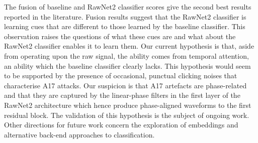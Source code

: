 \documentclass{article}
\begin{document}
The fusion of baseline and RawNet2 classifier scores give the second best results reported in the literature.
Fusion results suggest that the RawNet2 classifier is learning cues that are different to those learned by the baseline classifier. This observation raises the questions of what these cues are and what about the RawNet2 classifier enables it to learn them. Our current hypothesis is that, aside from operating upon the raw signal, the ability comes from temporal attention, an ability which the baseline classifier clearly lacks. 
This hypothesis would seem to be supported by the presence of occasional, punctual clicking noises that characterise A17 attacks. 
Our suspicion is that A17 artefacts are phase-related and that they are captured by the linear-phase filters in the first layer of the RawNet2 architecture which hence produce phase-aligned waveforms to the first residual block.
The validation of this hypothesis is the subject of ongoing work. Other directions for future work concern the exploration of embeddings and alternative back-end approaches to classification.

\vfill\pagebreak

\small





\end{document}

